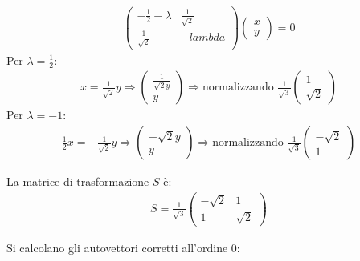 \begin{equation}\begin{split}
\left(\begin{matrix}-\frac{1}{2}-\lambda & \frac{1}{\sqrt{2}}\\\frac{1}{\sqrt{2}}&-lambda\end{matrix}\right)\left(\begin{matrix}x\\y\end{matrix}\right)=0
\end{split}\end{equation}
Per $\lambda=\frac{1}{2}$:
\begin{equation}\begin{split}
x=\frac{1}{\sqrt{2}}y \Longrightarrow \left(\begin{matrix}\frac{1}{\sqrt{2}y}\\y\end{matrix}\right) \Longrightarrow \textrm{normalizzando } \frac{1}{\sqrt{3}}\left(\begin{matrix}1\\\sqrt{2}\end{matrix}\right)
\end{split}\end{equation}
Per $\lambda=-1$:
\begin{equation}\begin{split}
\frac{1}{2}x=-\frac{1}{\sqrt{2}}y \Longrightarrow \left(\begin{matrix}-\sqrt{2}y\\y\end{matrix}\right) \Longrightarrow  \textrm{normalizzando } \frac{1}{\sqrt{3}}\left(\begin{matrix}-\sqrt{2}\\1\end{matrix}\right)
\end{split}\end{equation}

La matrice di trasformazione $S$ è:
\begin{equation}\begin{split}
S=\frac{1}{\sqrt{3}}\left(\begin{matrix}-\sqrt{2}&1\\1&\sqrt{2}\end{matrix}\right)
\end{split}\end{equation}


Si calcolano gli autovettori corretti all'ordine 0:


